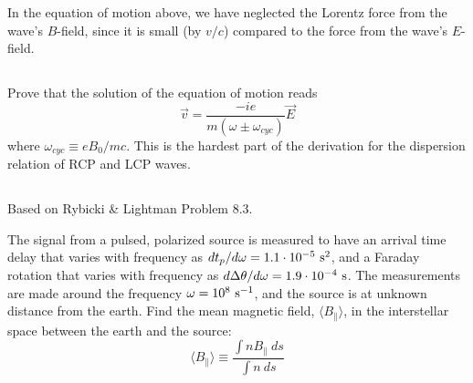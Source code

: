 \documentclass[11pt]{article}
\begin{document}
In the equation of motion above, we have neglected the Lorentz force from the wave's
$B$-field, since it is small (by $v/c$) compared to the force from the wave's $E$-field.

\subsection{}
Prove that the solution of the equation of motion reads
\begin{equation}
\vec v=\frac{-ie}{m(\omega\pm\omega_{cyc})}\vec E
\end{equation}
where $\omega_{cyc}\equiv eB_0/mc$.  This is the hardest part of the derivation for the dispersion
relation of RCP and LCP waves.

\subsection{}
Based on Rybicki \& Lightman Problem 8.3.

The signal from a pulsed, polarized source is measured to have an arrival time delay that varies
with frequency as $dt_p/d\omega=1.1\cdot10^{-5}~{\rm s}^2$, and a Faraday rotation that
varies with frequency as $d\Delta\theta/d\omega=1.9\cdot10^{-4}~{\rm s}$.  The measurements are
made around the frequency $\omega=10^8~{\rm s}^{-1}$, and the source is at unknown distance from
the earth.  Find the mean magnetic field, $\langle B_\parallel\rangle$, in the interstellar space
between the earth and the source:
\begin{equation}
\langle B_\parallel\rangle\equiv\frac{\int{n B_\parallel~ds}}{\int{n~ds}}
\end{equation}
\end{document}
